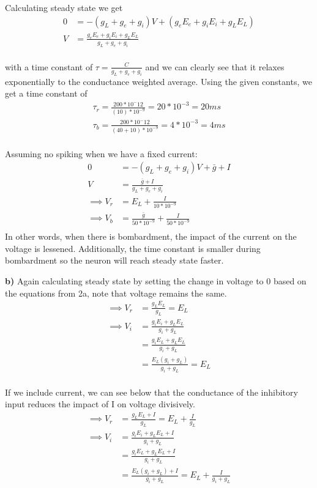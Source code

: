 \documentclass{article}
\begin{document}
Calculating steady state we get
\begin{align}
    0 &= -(g_L+g_e+g_i)V + (g_eE_e + g_iE_i + g_LE_L)\\
    V &=\frac{g_eE_e + g_iE_i + g_LE_L}{g_L+g_e+g_i}\\
\end{align}

with a time constant of $\tau = \frac{C}{g_L+g_e+g_i}$ and we can clearly see that
it relaxes exponentially to the conductance weighted average. Using
the given constants, we get a time constant of 
\begin{align}
    \tau_r = \frac{200*10^-12}{(10)*10^{-9}} = 20*10^{-3} = 20ms\\
    \tau_b = \frac{200*10^-12}{(40 + 10)*10^{-9}} = 4*10^{-3} = 4ms\\
\end{align}

Assuming no spiking when we have a fixed current:
\begin{align}
    0 &= -(g_L+g_e+g_i)V + \bar{g} + I\\
    V &=\frac{\bar{g} + I}{g_L+g_e+g_i}\\
    \implies V_r &= E_L + \frac{I}{10*10^{-9}}\\
    \implies V_b &= \frac{\bar{g}}{50*10^{-9}} + \frac{I}{50*10^{-9}}\\
\end{align}
In other words, when there is bombardment, the impact of the current on the 
voltage is lessened. Additionally, the time constant is smaller during bombardment
so the neuron will reach steady state faster.


\textbf{b)} Again calculating steady state by setting the change in voltage to 0 based on the equations from 2a, note that
voltage remains the same.
\begin{align}
    \implies V_r &= \frac{g_LE_L}{g_L} = E_L\\
    \implies V_i &= \frac{g_iE_i + g_LE_L}{g_i+g_L}\\
    &= \frac{g_iE_L + g_LE_L}{g_i+g_L}\\
    &= \frac{E_L(g_i + g_L)}{g_i+g_L} = E_L\\
\end{align}

If we include current, we can see below that the conductance of the inhibitory input
reduces the impact of I on voltage divisively.
\begin{align}
    \implies V_r &= \frac{g_LE_L + I}{g_L} = E_L + \frac{I}{g_L}\\
    \implies V_i &= \frac{g_iE_i + g_LE_L + I}{g_i+g_L}\\
    &= \frac{g_iE_L + g_LE_L + I}{g_i+g_L}\\
    &= \frac{E_L(g_i + g_L) + I}{g_i+g_L} = E_L + \frac{I}{g_i+g_L}\\
\end{align}
\end{document}
